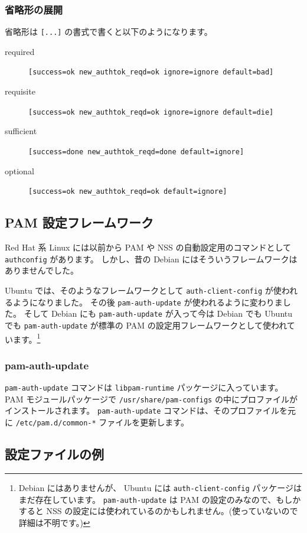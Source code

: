 \documentclass[mingoth,a4paper]{jsarticle}
\begin{document}
\subsubsection{省略形の展開}
\label{sec-1-4-6}

省略形は \verb~[...]~ の書式で書くと以下のようになります。

\begin{description}
\item[required] \verb~[success=ok new_authtok_reqd=ok ignore=ignore default=bad]~
\item[requisite] \verb~[success=ok new_authtok_reqd=ok ignore=ignore default=die]~
\item[sufficient] \verb~[success=done new_authtok_reqd=done default=ignore]~
\item[optional] \verb~[success=ok new_authtok_reqd=ok default=ignore]~
\end{description}
\subsection{PAM 設定フレームワーク}
\label{sec-1-5}

Red Hat 系 Linux には以前から PAM や NSS の自動設定用のコマンドとして \verb~authconfig~ があります。
しかし、昔の Debian にはそういうフレームワークはありませんでした。

Ubuntu では、そのようなフレームワークとして \verb~auth-client-config~ が使われるようになりました。
その後 \verb~pam-auth-update~ が使われるように変わりました。
そして Debian にも \verb~pam-auth-update~ が入って今は Debian でも Ubuntu でも \verb~pam-auth-update~ が標準の PAM の設定用フレームワークとして使われています。\footnote{Debian にはありませんが、 Ubuntu には \verb~auth-client-config~ パッケージはまだ存在しています。 \verb~pam-auth-update~ は PAM の設定のみなので、もしかすると NSS の設定には使われているのかもしれません。(使っていないので詳細は不明です。) }
\subsubsection{pam-auth-update}
\label{sec-1-5-1}

\verb~pam-auth-update~ コマンドは \verb~libpam-runtime~ パッケージに入っています。
PAM モジュールパッケージで \verb~/usr/share/pam-configs~ の中にプロファイルがインストールされます。
\verb~pam-auth-update~ コマンドは、そのプロファイルを元に \verb~/etc/pam.d/common-*~ ファイルを更新します。
\subsection{設定ファイルの例}
\label{sec-1-6}
\end{document}
